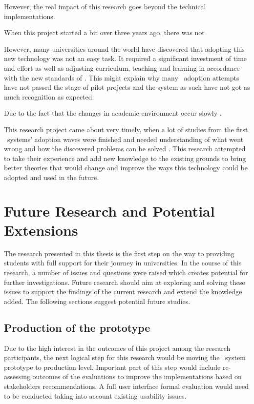 However, the real impact of this research goes beyond the technical
implementations.

When this project started a bit over three years ago, there was not 



However, many universities around the world have discovered that adopting
this new technology was not an easy task. It required a significant investment
of time and effort as well as adjusting curriculum, teaching and learning in
accordance with the new standards of \LLLsn. This might explain why many
\ep~adoption attempts have not passed the stage of pilot projects and the system
as such have not got as much recognition as expected.

Due to the fact that the changes in academic environment occur slowly 
\citep{Molebash1999}.

This research project came about very timely, when a lot of studies from the
first \ep~systems' adoption waves were finished and needed understanding of what
went wrong and how the discovered problems can be solved \citep{Batson2010}.
This research attempted to take their experience and add new knowledge to the
existing grounds to bring better theories that would change and improve the ways
this technology could be adopted and used in the future.

\section{Future Research and Potential Extensions}
The research presented in this thesis is the first step on the way to providing
students with full support for their \LLLs journey in universities. In the
course of this research, a number of issues and questions were raised which
creates potential for further investigations. Future research should aim at
exploring and solving these issues to support the findings of the current
research and extend the knowledge added. The following sections suggest
potential future studies.

\subsection{Production of the prototype}
Due to the high interest in the outcomes of this project among the research
participants, the next logical step for this research would be moving the
\ep~system prototype to production level. Important part of this step would
include re-assessing outcomes of the evaluations to improve the implementations
based on stakeholders recommendations. A full user interface formal evaluation
would need to be conducted taking into account existing usability issues.

